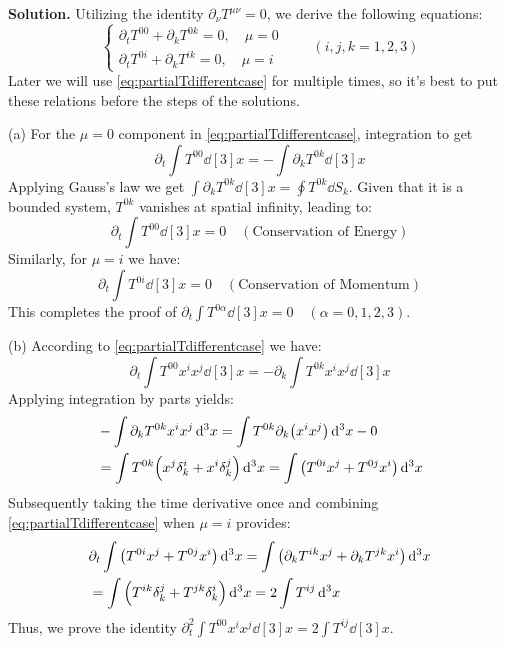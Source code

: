 \documentclass[12pt, a4paper, oneside]{article}
\newenvironment{solution}{\par\noindent\textbf{Solution. }}{\par}
\newcommand{\p}{\partial}
\begin{document}
\begin{solution}
    Utilizing the identity $\p_\nu T^{\mu\nu}=0$, we derive the following equations:
    \begin{equation}
        \begin{cases}
            \p_t T^{00}+\p_k T^{0k}=0, \quad \mu=0\\
            \p_t T^{0i}+\p_k T^{ik}=0, \quad \mu=i
        \end{cases}
        \qquad
        (i, j, k =1, 2, 3)\label{eq:partialTdifferentcase}
    \end{equation}
    Later we will use \cref{eq:partialTdifferentcase} for multiple times, so it's best to put these relations before the steps of the solutions.

    (a) For the $\mu=0$ component in \cref{eq:partialTdifferentcase}, integration to get
    \begin{equation}
        \p_t\int T^{00}\dd[3]{x}=-\int\p_k T^{0k}\dd[3]{x}
    \end{equation}
    Applying Gauss's law we get $\int \p_k T^{0k}\dd[3]{x}=\oint T^{0k}\dd{S_k}$. Given that it is a bounded system, $T^{0k}$ vanishes at spatial infinity, leading to:
    \begin{equation}
        \boxed{
        \p_t \int T^{00}\dd[3]{x} = 0 \quad (\text{Conservation of Energy})
        }
    \end{equation}
    Similarly, for $\mu = i$ we have:
    \begin{equation}
        \boxed{
        \p_t \int T^{0i}\dd[3]{x} = 0 \quad (\text{Conservation of Momentum})
        }
    \end{equation}
    This completes the proof of $\p_t \int T^{0\alpha}\dd[3]{x}=0\quad (\alpha = 0, 1, 2, 3)$.

    (b) According to \cref{eq:partialTdifferentcase} we have:
    \begin{equation*}
        \p_t \int T^{00}x^i x^j \dd[3]{x}=-\p_k \int T^{0k}x^i x^j\dd[3]{x}
    \end{equation*}
    Applying integration by parts yields:
    \begin{equation*}
        \begin{split}
            &-\int \p_k T^{0k}x^i x^j\dd[3]{x}=\int T^{0k}\p_k \qty(x^i x^j)\dd[3]{x}-0\\
            &=\int T^{0k}\qty(x^j\delta^i_k + x^i\delta^j_k)\dd[3]{x}=\int\qty(T^{0i}x^j+T^{0j}x^i)\dd[3]{x}
        \end{split}
    \end{equation*}
    Subsequently taking the time derivative once and combining \cref{eq:partialTdifferentcase} when $\mu=i$ provides:
    \begin{equation*}
        \begin{split}
            &\p_t\int \qty(T^{0i}x^j+T^{0j}x^i)\dd[3]{x}=\int\qty(\p_k T^{ik}x^j+\p_k T^{jk}x^i)\dd[3]{x}\\
            &=\int \qty(T^{ik}\delta^j_k+T^{jk}\delta^i_k)\dd[3]{x}=2\int T^{ij}\dd[3]{x}
        \end{split}
    \end{equation*}
    Thus, we prove the identity $\boxed{\p^2_t\int T^{00}x^i x^j\dd[3]{x}=2\int T^{ij}\dd[3]{x}}$.


\end{solution}
\end{document}
